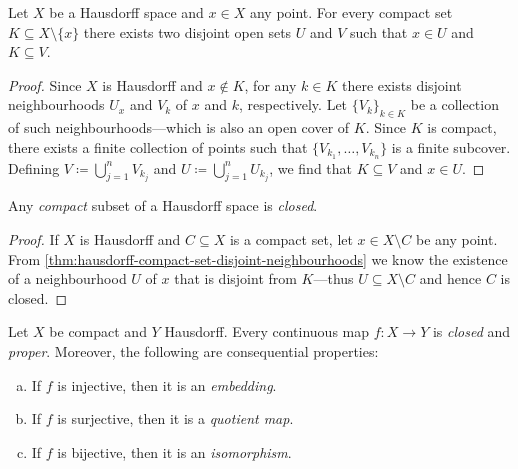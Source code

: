 \begin{theorem}
    \label{thm:hausdorff-compact-set-disjoint-neighbourhoods}
    Let \(X\) be a Hausdorff space and \(x \in X\) any point. For every compact set
    \(K \subseteq X \setminus \{x\}\) there exists two disjoint open sets \(U\) and
    \(V\) such that \(x \in U\) and \(K \subseteq V\).
\end{theorem}

\begin{proof}
    Since \(X\) is Hausdorff and \(x \notin K\), for any \(k \in K\) there exists
    disjoint neighbourhoods \(U_x\) and \(V_k\) of \(x\) and \(k\),
    respectively. Let \(\{V_{k}\}_{k \in K}\) be a collection of such neighbourhoods---which is also an open cover of \(K\). Since \(K\) is compact, there exists a
    finite collection of points such that \(\{V_{k_1}, \dots, V_{k_n}\}\) is a
    finite subcover. Defining \(V \coloneq \bigcup_{j=1}^n V_{k_j}\) and
    \(U \coloneq \bigcup_{j=1}^n U_{k_j}\), we find that \(K \subseteq V\) and
    \(x \in U\).
\end{proof}

\begin{corollary}
    \label{cor:hausdorff-compact-subset-is-closed}
    Any \emph{compact} subset of a Hausdorff space is \emph{closed}.
\end{corollary}

\begin{proof}
    If \(X\) is Hausdorff and \(C \subseteq X\) is a compact set, let
    \(x \in X \setminus C\) be any point. From
    \cref{thm:hausdorff-compact-set-disjoint-neighbourhoods} we know the existence
    of a neighbourhood \(U\) of \(x\) that is disjoint from \(K\)---thus
    \(U \subseteq X \setminus C\) and hence \(C\) is closed.
\end{proof}

\begin{corollary}
    \label{cor:map-compact-to-hausdorff-is-closed}
    Let \(X\) be compact and \(Y\) Hausdorff. Every continuous map \(f: X \to Y\) is
    \emph{closed} and \emph{proper}. Moreover, the following are consequential
    properties:
    \begin{enumerate}[(a)]\setlength\itemsep{0em}
        \item If \(f\) is injective, then it is an \emph{embedding}.
        \item If \(f\) is surjective, then it is a \emph{quotient map}.
        \item If \(f\) is bijective, then it is an \emph{isomorphism}.
    \end{enumerate}
\end{corollary}

